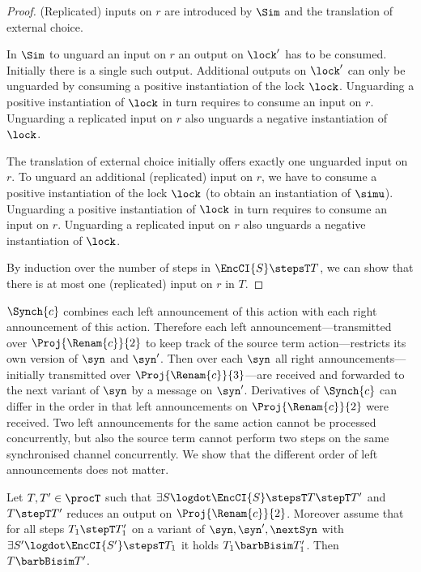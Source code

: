 \documentclass[]{eptcs}
\begin{document}
\begin{proof}
	(Replicated) inputs on $ r $ are introduced by $ \Sim $ and the translation of external choice.
	
	In $ \Sim $ to unguard an input on $ r $ an output on $ \lock' $ has to be consumed. Initially there is a single such output. Additional outputs on $ \lock' $ can only be unguarded by consuming a positive instantiation of the lock $ \lock $. Unguarding a positive instantiation of $ \lock $ in turn requires to consume an input on $ r $. Unguarding a replicated input on $ r $ also unguards a negative instantiation of $ \lock $.
	
	The translation of external choice initially offers exactly one unguarded input on $ r $. To unguard an additional (replicated) input on $ r $, we have to consume a positive instantiation of the lock $ \lock $ (to obtain an instantiation of $ \simu $). Unguarding a positive instantiation of $ \lock $ in turn requires to consume an input on $ r $. Unguarding a replicated input on $ r $ also unguards a negative instantiation of $ \lock $.
	
	By induction over the number of steps in $ \EncCI{S} \stepsT T $, we can show that there is at most one (replicated) input on $ r $ in $ T $.
\end{proof}

$ \Synch{c} $ combines each left announcement of this action with each right announcement of this action. Therefore each left announcement---transmitted over $ \Proj{\Renam{c}}{2} $ to keep track of the source term action---restricts its own version of $ \syn $ and $ \syn' $. Then over each $ \syn $ all right announcements---initially transmitted over $ \Proj{\Renam{c}}{3} $---are received and forwarded to the next variant of $ \syn $ by a message on $ \syn' $. Derivatives of $ \Synch{c} $ can differ in the order in that left announcements on $ \Proj{\Renam{c}}{2} $ were received. Two left announcements for the same action cannot be processed concurrently, but also the source term cannot perform two steps on the same synchronised channel concurrently. We show that the different order of left announcements does not matter.

\begin{lemma}
	Let $ T, T' \in \procT $ such that $ \exists S\logdot \EncCI{S} \stepsT T \stepT T' $ and $ T \stepT T' $ reduces an output on $ \Proj{\Renam{c}}{2} $. Moreover assume that for all steps $ T_1 \stepT T_1' $ on a variant of $ \syn, \syn', \nextSyn $ with $ \exists S'\logdot \EncCI{S'} \stepsT T_1 $ it holds $ T_1 \barbBisim T_1' $.
	Then $ T \barbBisim T' $.
	\label{lem:orderLeftAnn}
\end{lemma}
\end{document}

